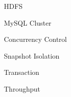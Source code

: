{\large %

\noindent HDFS

\noindent MySQL Cluster

\noindent Concurrency Control

\noindent Snapshot Isolation

\noindent Transaction

\noindent Throughput

}

\vfill

\cleardoublepage



\pagestyle{plain}



\def\contentsname{Index}
\tableofcontents
\newpage

\listoffigures
\newpage

\listoftables

\cleardoublepage


